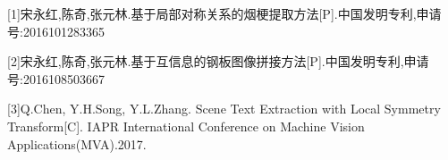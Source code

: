 ﻿%
%
%
%
%
%
[1]宋永红,陈奇,张元林.基于局部对称关系的烟梗提取方法[P].中国发明专利,申请号:2016101283365

[2]宋永红,陈奇,张元林.基于互信息的钢板图像拼接方法[P].中国发明专利,申请号:2016108503667

[3]Q.Chen, Y.H.Song, Y.L.Zhang. Scene Text Extraction with Local Symmetry Transform[C]. IAPR International Conference on Machine Vision Applications(MVA).2017.
\clearpage


